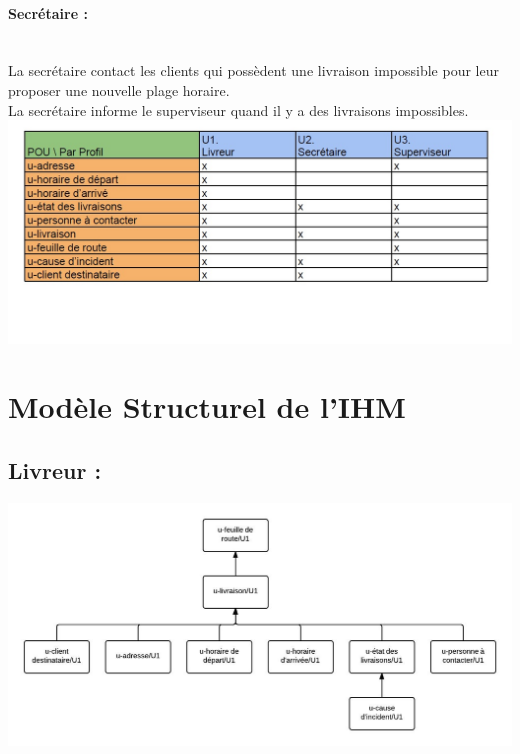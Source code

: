 \documentclass{report}
\begin{document}
\paragraph{Secrétaire :}
~~\\
La secrétaire contact les clients qui possèdent une livraison impossible pour leur proposer une nouvelle plage horaire.\\
La secrétaire informe le superviseur quand il y a des livraisons impossibles.\\

\includegraphics[scale = 0.5]{images/DICIHM.jpg}

\section{Modèle Structurel de l'IHM}

\subsection{Livreur : }
\includegraphics[scale = 0.33]{images/MSIHM-U1.jpeg}
\end{document}
